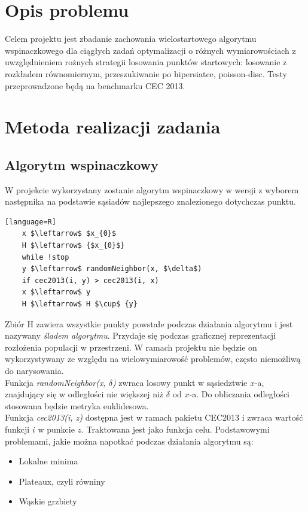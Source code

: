\documentclass{article}
\begin{document}
	\newpage
	\section{Opis problemu}
	
	Celem projektu jest zbadanie zachowania wielostartowego algorytmu wspinaczkowego dla ciągłych zadań optymalizacji o różnych wymiarowościach z uwzględnieniem rożnych strategii losowania punktów startowych: losowanie z rozkładem równomiernym, przeszukiwanie po hipersiatce, poisson-disc. Testy przeprowadzone będą na benchmarku CEC 2013.
	
	\section{Metoda realizacji zadania}
	
	\subsection{Algorytm wspinaczkowy}
	
	W projekcie wykorzystany zostanie algorytm wspinaczkowy w wersji z wyborem następnika na podstawie sąsiadów najlepszego znalezionego dotychczas punktu.
	
	\begin{lstlisting}[mathescape][language=R]
	x $\leftarrow$ $x_{0}$
	H $\leftarrow$ {$x_{0}$}
	while !stop
	y $\leftarrow$ randomNeighbor(x, $\delta$)
	if cec2013(i, y) > cec2013(i, x)
	x $\leftarrow$ y
	H $\leftarrow$ H $\cup$ {y}
	\end{lstlisting}
	Zbiór H zawiera wszystkie punkty powstałe podczas działania algorytmu i jest nazywany \textit{śladem algorytmu}. Przydaje się podczas graficznej reprezentacji rozłożenia populacji w przestrzeni. W ramach projektu nie będzie on wykorzystywany ze względu na wielowymiarowość problemów, często niemożliwą do narysowania. \\
	Funkcja \textit{randomNeighbor(x, $\delta$)} zwraca losowy punkt w sąsiedztwie $x$-a, znajdujący się w odległości nie większej niż $\delta$ od $x$-a. Do obliczania odległości stosowana będzie metryka euklidesowa. \\
	Funkcja \textit{cec2013(i, z)} dostępna jest w ramach pakietu CEC2013 i zwraca wartość funkcji $i$ w punkcie $z$. Traktowana jest jako funkcja celu.
	\newpage
	Podstawowymi problemami, jakie można napotkać podczas działania algorytmu są:
	\begin{itemize}
		\item Lokalne minima
		\item Plateaux, czyli równiny
		\item Wąskie grzbiety
	\end{itemize}
	
\end{document}
